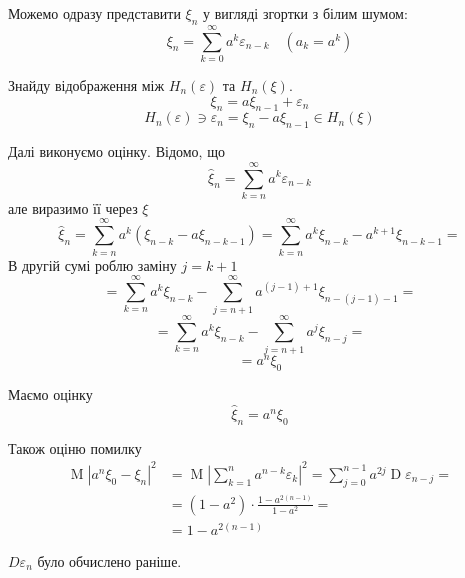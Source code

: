 \documentclass[11pt, a4paper]{article} %
\begin{document}
Можемо одразу представити $\xi_n$ у вигляді згортки з білим шумом:
\[\xi_n = \sum_{k=0}^\infty a^k\varepsilon_{n-k} \quad \left(a_k = a^k\right)\]

Знайду відображення між $H_n(\varepsilon)$ та $H_n(\xi)$. 
\[\xi_n = a\xi_{n-1} + \varepsilon_n\]
\[H_n(\varepsilon) \ni \varepsilon_n = \xi_n - a\xi_{n-1} \in H_n(\xi)\]

Далі виконуємо оцінку. Відомо, що 
\[\hat\xi_n = \sum_{k=n}^\infty a^k \varepsilon_{n-k}\]
але виразимо її через $\xi$
\[\hat\xi_n = \sum_{k=n}^\infty a^k (\xi_{n-k} - a\xi_{n-k-1}) = \sum_{k=n}^\infty a^k \xi_{n-k} - a^{k+1}\xi_{n-k-1} = \]
В другій сумі роблю заміну $j=k+1$
\[= \sum_{k=n}^\infty a^k \xi_{n-k} - \sum_{j=n+1}^\infty a^{(j-1)+1} \xi_{n-(j-1)-1} = \]
\[= \sum_{k=n}^\infty a^k \xi_{n-k} - \sum_{j=n+1}^\infty a^{j} \xi_{n-j} = \]
\[= a^n\xi_0 \]

Маємо оцінку 
\[\hat\xi_n = a^n\xi_0\]

Також оціню помилку
\begin{align*}
    \operatorname{M}|a^n\xi_0 - \xi_n|^2 &= \operatorname{M}|\sum_{k=1}^n a^{n-k}\varepsilon_k|^2 = \sum_{j=0}^{n-1} a^{2j} \operatorname{D} \varepsilon_{n-j} = \\
    &= (1-a^2)\cdot \frac{1-a^{2(n-1)}}{1-a^2} =\\
    &= 1-a^{2(n-1)}
\end{align*}

$D\varepsilon_{n}$ було обчислено раніше.
\end{document}
